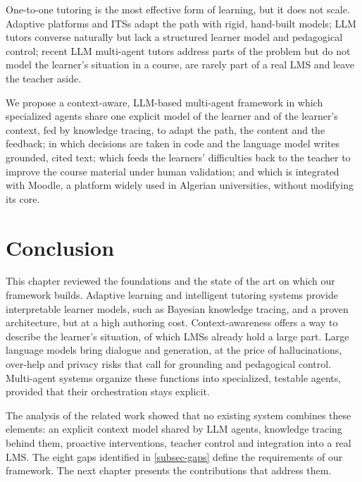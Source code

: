 \begin{summarybox}
One-to-one tutoring is the most effective form of learning, but it does
not scale. Adaptive platforms and ITSs adapt the path with rigid,
hand-built models; LLM tutors converse naturally but lack a structured
learner model and pedagogical control; recent LLM multi-agent tutors
address parts of the problem but do not model the learner's situation in a
course, are rarely part of a real LMS and leave the teacher aside.
\par\medskip
We propose a context-aware, LLM-based multi-agent framework in which
specialized agents share one explicit model of the learner and of the
learner's context, fed by knowledge tracing, to adapt the path, the
content and the feedback; in which decisions are taken in code and the
language model writes grounded, cited text; which feeds the learners'
difficulties back to the teacher to improve the course material under
human validation; and which is integrated with Moodle, a platform widely
used in Algerian universities, without modifying its core.
\end{summarybox}

\section*{Conclusion}

This chapter reviewed the foundations and the state of the art on which
our framework builds. Adaptive learning and intelligent tutoring systems
provide interpretable learner models, such as Bayesian knowledge tracing,
and a proven architecture, but at a high authoring cost. Context-awareness
offers a way to describe the learner's situation, of which LMSs already
hold a large part. Large language models bring dialogue and generation, at
the price of hallucinations, over-help and privacy risks that call for
grounding and pedagogical control. Multi-agent systems organize these
functions into specialized, testable agents, provided that their
orchestration stays explicit.

The analysis of the related work showed that no existing system combines
these elements: an explicit context model shared by LLM agents, knowledge
tracing behind them, proactive interventions, teacher control and
integration into a real LMS. The eight gaps identified in
\cref{subsec-gaps} define the requirements of our framework. The next
chapter presents the contributions that address them.
